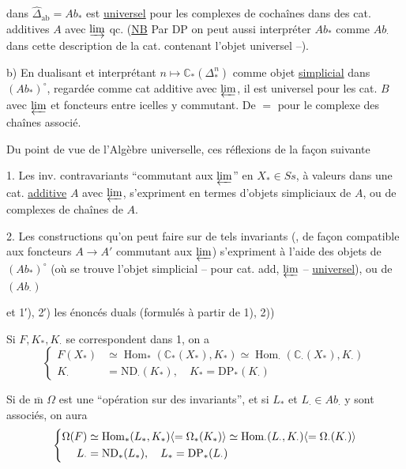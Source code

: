 
dans $\widehat\Delta_{\mathrm{ab}}=\mathit{Ab}_{\ast}$ est \uline{universel} pour les
complexes de cochaînes dans des cat.
additives $A$ avec $\varinjlim$ qc. (\uline{NB} Par DP
on peut aussi interpréter $\mathit{Ab}_{\ast}$ comme $\mathit{Ab}_{\cdot}$
dans cette description de la cat. contenant
l'objet universel --).

b) En dualisant et interprétant
$n\longmapsto\mathbb C_{\ast}(\Delta^{n}_{\ast})$ comme objet \uline{simplicial}
dans $(\mathit{Ab}_{\ast})^{\circ}$, regardée comme cat additive
avec $\varprojlim$, il est universel pour les
cat. $B$ avec $\varprojlim$ et foncteurs entre
icelles y commutant. De $=$ pour le
complexe des chaînes associé.

Du point de vue de l'Algèbre universelle,
  ces
réflexions de la façon suivante

1. Les inv. contravariants ``commutant aux
$\varprojlim$'' en $X_{\ast}\in\mathit{Ss}$, à valeurs dans une
cat. \uline{additive} $A$ avec $\varprojlim$, s'expriment
 en termes d'objets simpliciaux
de $A$, ou de complexes de chaînes de $A$.

2. Les constructions qu'on peut faire sur de
tels invariants (, de façon compatible aux
foncteurs $A\longrightarrow A'$ commutant aux $\varprojlim$)
s'expriment à l'aide des objets
de $(\mathit{Ab}_{\ast})^{\circ}$ (où se trouve l'objet
simplicial -- pour cat. add, $\varprojlim$ --
\uline{universel}), ou de $(\mathit{Ab}_{\cdot})$

et 1′), 2′) les énoncés duals (formulés
à partir de 1), 2))

Si $F,K_{\ast},K_{\cdot}$ se correspondent dans
1, on a
\[
\left\{\begin{aligned}
F(X_{\ast})&\simeq\operatorname{Hom}_{\ast}(\mathbb C_{\ast}(X_{\ast}),K_{\ast})
\simeq\operatorname{Hom}_{\cdot}(\mathbb C_{\cdot}(X_{\ast}),K_{\cdot})\\
K_{\cdot}&=\mathrm{ND}_{\cdot}(K_{\ast}),\quad K_{\ast}=\mathrm{DP}_{\ast}(K_{\cdot})
\end{aligned}\right.
\]

Si de $\overline{\mathrm m}$ $\Omega$ est une ``opération sur des
invariants'', et si $L_{\ast}$ et $L_{\cdot}\in\mathit{Ab}_{\cdot}$ y
sont associés, on aura
\[
\left\{\begin{aligned}
\Omega(F)&\simeq\operatorname{Hom}_{\ast}(L_{\ast},K_{\ast})\inserted{=\Omega_{\ast}(K_{\ast})}
\simeq\operatorname{Hom}_{\cdot}(L_{\cdot},K_{\cdot})\inserted{=\Omega_{\cdot}(K_{\cdot})}\\
L_{\cdot}&=\mathrm{ND}_{\ast}(L_{\ast}),\quad L_{\ast}=\mathrm{DP}_{\ast}(L_{\cdot})
\end{aligned}\right.
\]

